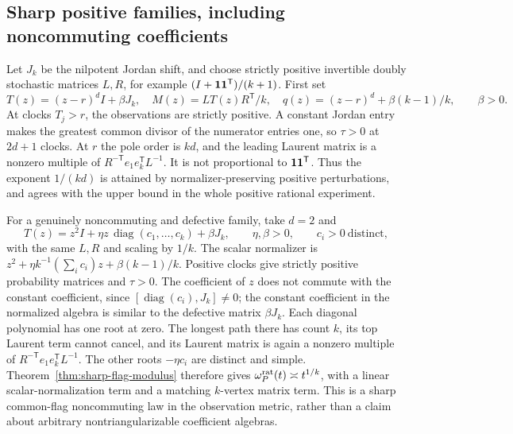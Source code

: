 \subsection{Sharp positive families, including noncommuting coefficients}
Let $J_k$ be the nilpotent Jordan shift, and choose strictly positive
invertible doubly stochastic matrices $L,R$, for example
$(I+\mathbf 1\mathbf 1^{\mathsf T})/(k+1)$. First set
\[
 T(z)=(z-r)^dI+\beta J_k,\quad
 M(z)=LT(z)R^{\mathsf T}/k,\quad
 q(z)=(z-r)^d+\beta(k-1)/k,\qquad\beta>0.
\]
At clocks $T_j>r$, the observations are strictly positive. A constant
Jordan entry makes the greatest common divisor of the numerator
entries one, so $\tau>0$ at $2d+1$ clocks. At $r$ the pole order is
$kd$, and the leading Laurent matrix is a nonzero multiple of
$R^{-\mathsf T}e_1e_k^{\mathsf T}L^{-1}$. It is not proportional to
$\mathbf 1\mathbf 1^{\mathsf T}$. Thus the exponent $1/(kd)$ is attained by
normalizer-preserving positive perturbations, and agrees with the
upper bound in the whole positive rational experiment.

For a genuinely noncommuting and defective family, take $d=2$ and
\[
 T(z)=z^2I+\eta z\,\operatorname{diag}(c_1,\ldots,c_k)+\beta J_k,
 \qquad \eta,\beta>0,\qquad c_i>0\ \text{distinct},
\]
with the same $L,R$ and scaling by $1/k$. The scalar normalizer is
$z^2+\eta k^{-1}(\sum_i c_i)z+\beta(k-1)/k$. Positive clocks give
strictly positive probability matrices and $\tau>0$. The coefficient
of $z$ does not commute with the constant coefficient, since
$[\operatorname{diag}(c_i),J_k]\ne0$; the constant coefficient in the
normalized algebra is similar to the defective matrix $\beta J_k$.
Each diagonal polynomial has one root at zero. The longest path
there has count $k$, its top Laurent term cannot cancel, and its
Laurent matrix is again a nonzero multiple of
$R^{-\mathsf T}e_1e_k^{\mathsf T}L^{-1}$. The other roots
$-\eta c_i$ are distinct and simple. Theorem~\ref{thm:sharp-flag-modulus}
therefore gives $\omega^{\rm rat}_P(t)\asymp t^{1/k}$, with a linear
scalar-normalization term and a matching $k$-vertex matrix term.
This is a sharp common-flag noncommuting law in the observation
metric, rather than a claim about arbitrary nontriangularizable
coefficient algebras.
